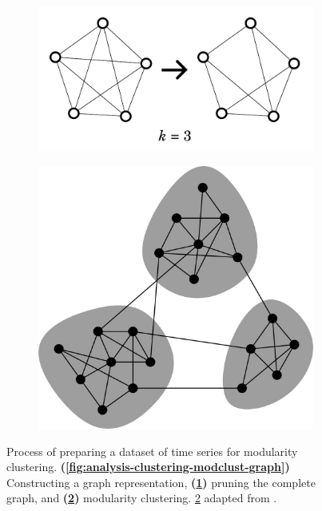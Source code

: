 \begin{figure}
  \begin{subfigure}[t]{0.45\textwidth}
  \centering
    \includegraphics[width=\linewidth]{pruning}
    \caption{
    }
    \label{fig:analysis-clustering-modclust-prune}
  \end{subfigure}%
  \begin{subfigure}[t]{0.45\textwidth}
  \centering
    \includegraphics[width=\linewidth]{newmanModularityCommunityStructure2006_1}
    \caption{
    }
    \label{fig:analysis-clustering-modclust-modclust}
  \end{subfigure}

  \caption[
    Modularity clustering visualises natural groupings of time series
  ]{
    Process of preparing a dataset of time series for modularity clustering.
    \textbf{(\ref{fig:analysis-clustering-modclust-graph})}
    Constructing a graph representation,
    \textbf{(\ref{fig:analysis-clustering-modclust-prune})}
    pruning the complete graph, and
    \textbf{(\ref{fig:analysis-clustering-modclust-modclust})}
    modularity clustering.
    \ref{fig:analysis-clustering-modclust-modclust} adapted from \textcite{newmanModularityCommunityStructure2006}.
  }
  \label{fig:analysis-clustering-modclust}
\end{figure}

